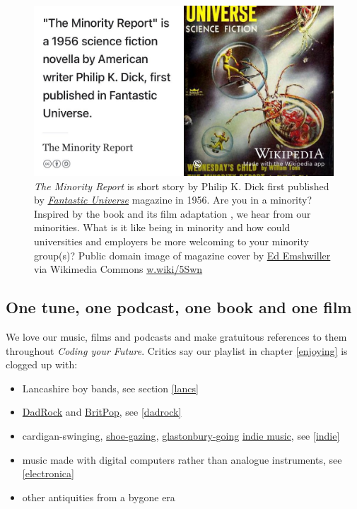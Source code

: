 \documentclass[
]{book}
\providecommand{\tightlist}{%
  \setlength{\itemsep}{0pt}\setlength{\parskip}{0pt}}
\begin{document}
\begin{figure}

{\centering \includegraphics[width=0.99\linewidth]{images/minority-report} 

}

\caption{\emph{The Minority Report} is short story by Philip K. Dick first published by \emph{\href{https://en.wikipedia.org/wiki/Fantastic_Universe}{Fantastic Universe}} magazine in 1956. Are you in a minority? Inspired by the book \citep{theminorityreport} and its film adaptation \citep{minorityreport}, we hear from our minorities. What is it like being in minority and how could universities and employers be more welcoming to your minority group(s)? Public domain image of magazine cover by \href{https://en.wikipedia.org/wiki/Ed_Emshwiller}{Ed Emshwiller} via Wikimedia Commons \href{https://w.wiki/5Swn}{w.wiki/5Swn}}\label{fig:minority-fig}
\end{figure}



\hypertarget{otopof}{%
\subsection{One tune, one podcast, one book and one film}\label{otopof}}

We love our music, films and podcasts and make gratuitous references to them throughout \emph{Coding your Future}. Critics say our playlist in chapter \ref{enjoying} is clogged up with:

\begin{itemize}
\tightlist
\item
  Lancashire boy bands, see section \ref{lancs}
\item
  \href{https://www.amazon.co.uk/Dad-Rock/dp/B09F6GQSKK}{DadRock} and \href{https://en.wikipedia.org/wiki/Britpop}{BritPop}, see \ref{dadrock}
\item
  cardigan-swinging, \href{https://en.wikipedia.org/wiki/Shoegaze}{shoe-gazing}, \href{https://en.wikipedia.org/wiki/Glastonbury_Festival}{glastonbury-going} \href{https://en.wikipedia.org/wiki/Indie_rock}{indie music}, see \ref{indie}
\item
  music made with digital computers rather than analogue instruments, see \ref{electronica}
\item
  other antiquities from a bygone era \citep{dadrock2}
\end{itemize}
\end{document}

